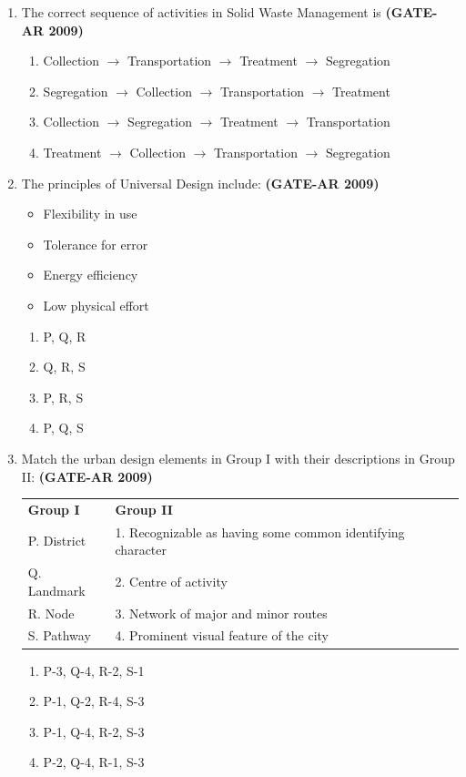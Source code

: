 \documentclass[a4paper,10pt]{article}
\begin{document}
\begin{enumerate}
	\item The correct sequence of activities in Solid Waste Management is \hfill \textbf{(GATE-AR 2009)}
    \begin{enumerate}
        \item Collection $\to$ Transportation $\to$ Treatment $\to$ Segregation
        \item Segregation $\to$ Collection $\to$ Transportation $\to$ Treatment
        \item Collection $\to$ Segregation $\to$ Treatment $\to$ Transportation
        \item Treatment $\to$ Collection $\to$ Transportation $\to$ Segregation
    \end{enumerate}
    
    \item The principles of Universal Design include: \hfill \textbf{(GATE-AR 2009)}
    \begin{itemize}
        \item Flexibility in use
        \item Tolerance for error
        \item Energy efficiency
        \item Low physical effort
    \end{itemize}
    \begin{multicols}{4}
	\begin{enumerate}
        \item P, Q, R
        \item Q, R, S
        \item P, R, S
        \item P, Q, S
    \end{enumerate}
	\end{multicols}
    
    \item Match the urban design elements in Group I with their descriptions in Group II: \hfill \textbf{(GATE-AR 2009)} \\
    \begin{tabular}{ l l }
	\textbf{Group I} & \textbf{Group II} \\
	P. District & 1. Recognizable as having some common identifying character \\
	Q. Landmark & 2. Centre of activity \\
	R. Node & 3. Network of major and minor routes \\
	S. Pathway & 4. Prominent visual feature of the city \\
	\end{tabular}
	\begin{multicols}{2}
	\begin{enumerate}
        \item P-3, Q-4, R-2, S-1
        \item P-1, Q-2, R-4, S-3
        \item P-1, Q-4, R-2, S-3
        \item P-2, Q-4, R-1, S-3
    \end{enumerate}
	\end{multicols}


\end{enumerate}
\end{document}
